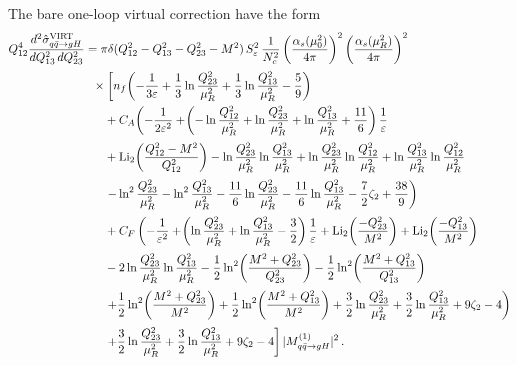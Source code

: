 The bare one-loop virtual correction have the form
\begin{equation}
\label{eq:VIRT-bare}
\begin{aligned}
  &Q_{12}^4\frac{d^2\hat\sigma_{q\bar{q}\to g H}^{\rm VIRT}}{dQ_{13}^2\,dQ_{23}^2} =
  \pi\delta(Q_{12}^2-Q_{13}^2-Q_{23}^2-M^2)\,S_\varepsilon^2\,\frac{1}{N_c^2}
 \left(\frac{\alpha_s(\mu_0^2)}{4\pi}\right)^2
   \left(\frac{\alpha_s(\mu_R^2)}{4\pi}\right)^2  \\[0.5ex]
  &\quad\qquad\qquad\qquad\times\left[ n_f\!\left(-\frac{1}{3\varepsilon}
  +\frac{1}{3}\ln\frac{Q_{23}^2}{\mu_R^2}
  +\frac{1}{3}\ln\frac{Q_{13}^2}{\mu_R^2}
  -\frac{5}{9}\right) \right.\\
   &\qquad\qquad\qquad\qquad+C_A\!\left(-\frac{1}{2\varepsilon^2}
  +\!\left(-\ln\frac{Q_{12}^2}{\mu_R^2}
  +\ln\frac{Q_{23}^2}{\mu_R^2}
  +\ln\frac{Q_{13}^2}{\mu_R^2}
  +\frac{11}{6}\right)\frac{1}{\varepsilon}\right.\\[0.5ex]
  &\qquad\qquad\qquad\qquad+\operatorname{Li}_2\!\left(
  \frac{Q_{12}^2-M^2}{Q_{12}^2}\right)
  -\ln\frac{Q_{23}^2}{\mu_R^2}\ln\frac{Q_{13}^2}{\mu_R^2}
  +\ln\frac{Q_{23}^2}{\mu_R^2}\ln\frac{Q_{12}^2}{\mu_R^2}
  +\ln\frac{Q_{13}^2}{\mu_R^2}\ln\frac{Q_{12}^2}{\mu_R^2}\\[0.5ex]
  &\qquad\qquad\qquad\qquad\left.-\ln^2\frac{Q_{23}^2}{\mu_R^2}
  -\ln^2\frac{Q_{13}^2}{\mu_R^2}
  -\frac{11}{6}\ln\frac{Q_{23}^2}{\mu_R^2}
  -\frac{11}{6}\ln\frac{Q_{13}^2}{\mu_R^2}
  -\frac{7}{2}\zeta_2+\frac{38}{9}\right)\\[0.5ex]
  &\qquad\qquad\qquad\qquad+C_F\left(-\frac{1}{\varepsilon^2}
  +\!\left(\ln\frac{Q_{23}^2}{\mu_R^2}
  +\ln\frac{Q_{13}^2}{\mu_R^2}-\frac{3}{2}\right)\frac{1}{\varepsilon}
  +\operatorname{Li}_2\!\left(\frac{-Q_{23}^2}{M^2}\right)
  +\operatorname{Li}_2\!\left(\frac{-Q_{13}^2}{M^2}\right)\right.\\[0.5ex]
  &\qquad\qquad\qquad\qquad-2\ln\frac{Q_{23}^2}{\mu_R^2}\ln\frac{Q_{13}^2}{\mu_R^2}
  -\frac{1}{2}\ln^2\!\left(\frac{M^2+Q_{23}^2}{Q_{23}^2}\right)
  -\frac{1}{2}\ln^2\!\left(\frac{M^2+Q_{13}^2}{Q_{13}^2}\right)\\[0.5ex]
  &\qquad\qquad\qquad\qquad\left.+\frac{1}{2}\ln^2\!\left(\frac{M^2+Q_{23}^2}{M^2}\right)
  +\frac{1}{2}\ln^2\!\left(\frac{M^2+Q_{13}^2}{M^2}\right)
  +\frac{3}{2}\ln\frac{Q_{23}^2}{\mu_R^2}
  +\frac{3}{2}\ln\frac{Q_{13}^2}{\mu_R^2}
  +9\zeta_2-4\right)\\[0.5ex]
  &\qquad\qquad\qquad\qquad\left.+\frac{3}{2}\ln\frac{Q_{23}^2}{\mu_R^2}
  +\frac{3}{2}\ln\frac{Q_{13}^2}{\mu_R^2}
  +9\zeta_2-4\right]|M^{(1)}_{q\bar{q}\to g H}|^2\,.
\end{aligned}
\end{equation}
